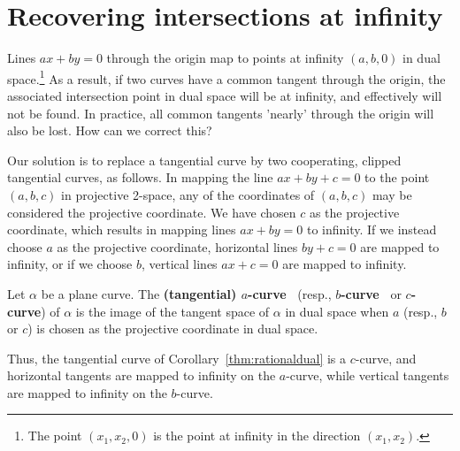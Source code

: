 \documentclass[9pt,twocolumn]{article}
\newcommand{\tang}{tangential curve\ }
\newcommand{\acurve}{$a$-curve\ }
\newcommand{\bcurve}{$b$-curve\ }
\begin{document}
{
}

\section{Recovering intersections at infinity}
\label{sec:infinity}

Lines $ax+by=0$ through the origin map to points at infinity
$(a,b,0)$ in dual space.\footnote{The point $(x_1,x_2,0)$ 
	is the point at infinity in the direction $(x_1,x_2)$.}
As a result, if two curves have a common tangent through the origin, 
the associated intersection point in dual space will be at infinity, 
and effectively will not be found.
In practice, all common tangents 'nearly' through the origin will also be lost.
How can we correct this?

Our solution is to replace a tangential curve by two cooperating,
clipped tangential curves, as follows.
In mapping the line $ax+by+c=0$ to the point $(a,b,c)$ in projective 2-space, 
any of the coordinates of $(a,b,c)$ may be considered the projective coordinate.
We have chosen $c$ as the projective coordinate, which results in mapping lines 
$ax+by=0$ to infinity.
If we instead choose $a$ as the projective coordinate, 
horizontal lines $by+c=0$ are mapped to infinity,
or if we choose $b$, vertical lines $ax+c=0$ are mapped to infinity.
%
\begin{defn2}
Let $\alpha$ be a plane curve.
The {\bf (tangential) \acurve} (resp., {\bf \bcurve} or {\bf $c$-curve}) 
of $\alpha$ is the image of 
the tangent space of $\alpha$ in dual space when $a$ (resp., $b$ or $c$) is chosen as the
projective coordinate in dual space.
\end{defn2}
%
Thus, the tangential curve of Corollary~\ref{thm:rationaldual}
is a $c$-curve, and horizontal tangents are mapped to infinity on the $a$-curve,
while vertical tangents are mapped to infinity on the $b$-curve.
\end{document}
